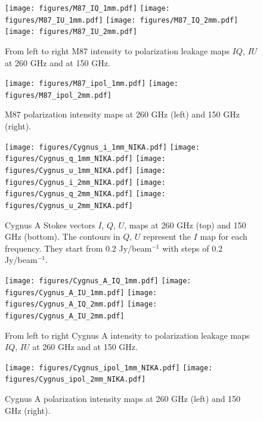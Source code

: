 \documentclass[twocolumn,traditabstract]{aa}
\begin{document}
   \begin{figure}
  \begin{center}
   \texttt{[image: figures/M87\_IQ\_1mm.pdf]}
    \texttt{[image: figures/M87\_IU\_1mm.pdf]}
  \texttt{[image: figures/M87\_IQ\_2mm.pdf]}
    \texttt{[image: figures/M87\_IU\_2mm.pdf]}
  \caption{ From left to right M87 intensity to polarization leakage maps $IQ$, $IU$ at 260 GHz and at 150 GHz.}
  \label{M87_leakage}
  \end{center}
  \end{figure}
  
  \begin{figure}
  \begin{center}
  \texttt{[image: figures/M87\_ipol\_1mm.pdf]}
  \texttt{[image: figures/M87\_ipol\_2mm.pdf]}
    \caption{ M87 polarization intensity maps at 260 GHz (left) and 150 GHz (right). }
      \label{M87_ipol}
  \end{center}
  \end{figure} 
 
  
 \begin{figure}
  \begin{center}
  \texttt{[image: figures/Cygnus\_i\_1mm\_NIKA.pdf]}
   \texttt{[image: figures/Cygnus\_q\_1mm\_NIKA.pdf]}
   \texttt{[image: figures/Cygnus\_u\_1mm\_NIKA.pdf]}
   \texttt{[image: figures/Cygnus\_i\_2mm\_NIKA.pdf]}
   \texttt{[image: figures/Cygnus\_q\_2mm\_NIKA.pdf]}
   \texttt{[image: figures/Cygnus\_u\_2mm\_NIKA.pdf]}
   \caption{ Cygnus A Stokes vectors $I$, $Q$, $U$, maps  at 260 GHz (top) and 150 GHz (bottom). The contours in $Q$, $U$ represent the $I$ map for each frequency. They start from 0.2 Jy/beam$^{-1}$ with steps of 0.2 Jy/beam$^{-1}$. }
    \label{cygnusa_maps}
  \end{center}
  \end{figure}
  
   \begin{figure}
  \begin{center}
   \texttt{[image: figures/Cygnus\_A\_IQ\_1mm.pdf]}
    \texttt{[image: figures/Cygnus\_A\_IU\_1mm.pdf]}
  \texttt{[image: figures/Cygnus\_A\_IQ\_2mm.pdf]}
    \texttt{[image: figures/Cygnus\_A\_IU\_2mm.pdf]}
  \caption{ From left to right Cygnus A intensity to polarization leakage maps $IQ$, $IU$ at 260 GHz and at 150 GHz.}
  \label{cygnusa_leakage}
  \end{center}
  \end{figure}
  
  \begin{figure}
  \begin{center}
  \texttt{[image: figures/Cygnus\_ipol\_1mm\_NIKA.pdf]}
  \texttt{[image: figures/Cygnus\_ipol\_2mm\_NIKA.pdf]}
    \caption{ Cygnus A polarization intensity maps at 260 GHz (left) and 150 GHz (right). }
      \label{cygnusa_ipol}
  \end{center}
  \end{figure} 
 
\end{document}

